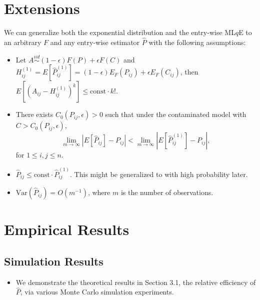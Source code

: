 \documentclass[a4paper]{article}
\renewcommand{\hat}{\widehat}
\begin{document}
\section{Extensions}
\label{section:extension}
We can generalize both the exponential distribution and the entry-wise ML$q$E to an arbitrary $F$ and any entry-wise estimator $\hat{P}$ with the following assumptions:
\begin{itemize}
\item Let $A \stackrel{iid}{\sim} (1-\epsilon) F(P) + \epsilon F(C) $ and $H_{ij}^{(1)} = E[\hat{P}_{ij}^{(1)}] = (1-\epsilon) E_F(P_{ij}) + \epsilon E_F(C_{ij})$, then $E[(A_{ij} - H_{ij}^{(1)})^k] \le \mathrm{const} \cdot k!$.
\item There exists $C_0(P_{ij}, \epsilon) > 0$ such that under the contaminated model with $C > C_0(P_{ij}, \epsilon)$,
\[
	\lim_{m \to \infty} \left| E[\hat{P}_{ij}] - P_{ij} \right| < 
    \lim_{m \to \infty} \left| E[\hat{P}^{(1)}_{ij}] - P_{ij} \right|,
\]
for $1 \le i, j \le n$.
\item $\hat{P}_{ij} \le \mathrm{const} \cdot \hat{P}_{ij}^{(1)}$. This might be generalized to with high probability later.
\item $\mathrm{Var}(\hat{P}_{ij}) = O(m^{-1})$, where $m$ is the number of observations.
\end{itemize}

\section{Empirical Results}

\subsection{Simulation Results}

\begin{itemize}
\item We demonstrate the theoretical results in Section 3.1, the relative efficiency of $\hat{P}$, via various Monte Carlo simulation experiments.
\end{itemize}
\end{document}

